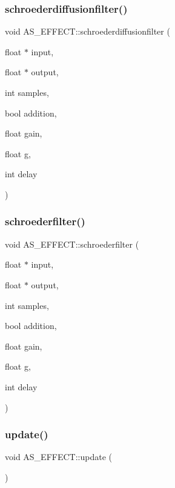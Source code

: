 \subsubsection{schroederdiffusionfilter()}
{\footnotesize\ttfamily void A\+S\+\_\+\+E\+F\+F\+E\+C\+T\+::schroederdiffusionfilter (\begin{DoxyParamCaption}\item[{float $\ast$}]{input,  }\item[{float $\ast$}]{output,  }\item[{int}]{samples,  }\item[{bool}]{addition,  }\item[{float}]{gain,  }\item[{float}]{g,  }\item[{int}]{delay }\end{DoxyParamCaption})}

\mbox{\label{class_a_s___e_f_f_e_c_t_ad3688ba20390c6cb82e32bc6e73da3f4}} 
\subsubsection{schroederfilter()}
{\footnotesize\ttfamily void A\+S\+\_\+\+E\+F\+F\+E\+C\+T\+::schroederfilter (\begin{DoxyParamCaption}\item[{float $\ast$}]{input,  }\item[{float $\ast$}]{output,  }\item[{int}]{samples,  }\item[{bool}]{addition,  }\item[{float}]{gain,  }\item[{float}]{g,  }\item[{int}]{delay }\end{DoxyParamCaption})}

\mbox{\label{class_a_s___e_f_f_e_c_t_a64770d59c5b7548df8f07fef55ae8027}} 
\subsubsection{update()}
{\footnotesize\ttfamily void A\+S\+\_\+\+E\+F\+F\+E\+C\+T\+::update (\begin{DoxyParamCaption}{ }\end{DoxyParamCaption})}



